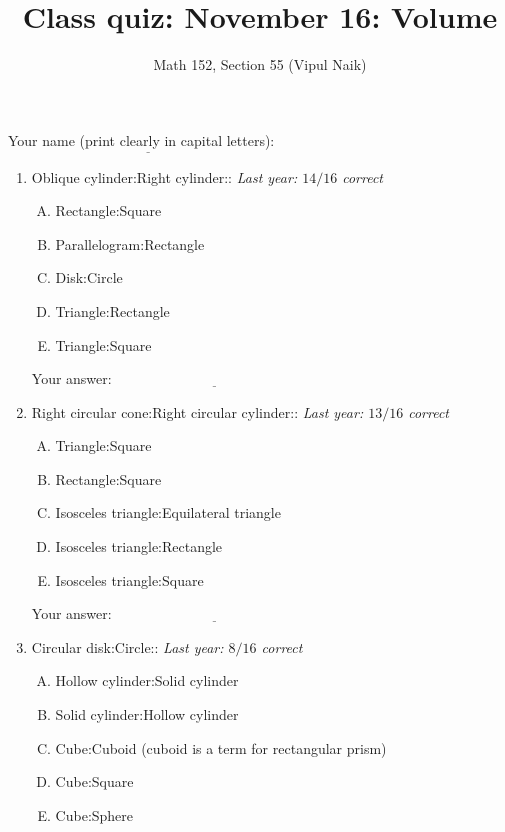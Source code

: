\documentclass[10pt]{amsart}
\title{Class quiz: November 16: Volume}
\author{Math 152, Section 55 (Vipul Naik)}
\begin{document}
\maketitle

Your name (print clearly in capital letters): $\underline{\qquad\qquad\qquad\qquad\qquad\qquad\qquad\qquad\qquad\qquad}$

\begin{enumerate}
\item Oblique cylinder:Right cylinder:: {\em Last year: $14/16$
  correct}

  \begin{enumerate}[(A)]
  \item Rectangle:Square
  \item Parallelogram:Rectangle
  \item Disk:Circle
  \item Triangle:Rectangle
  \item Triangle:Square
  \end{enumerate}

  \vspace{0.3in}
  Your answer: $\underline{\qquad\qquad\qquad\qquad\qquad\qquad\qquad}$
  \vspace{0.3in}

\item Right circular cone:Right circular cylinder:: {\em Last year:
  $13/16$ correct}

  \begin{enumerate}[(A)]
  \item Triangle:Square
  \item Rectangle:Square
  \item Isosceles triangle:Equilateral triangle
  \item Isosceles triangle:Rectangle
  \item Isosceles triangle:Square
  \end{enumerate}

  
  Your answer: $\underline{\qquad\qquad\qquad\qquad\qquad\qquad\qquad}$
  \vspace{0.3in}

\item Circular disk:Circle:: {\em Last year: $8/16$ correct}

  \begin{enumerate}[(A)]
  \item Hollow cylinder:Solid cylinder
  \item Solid cylinder:Hollow cylinder
  \item Cube:Cuboid (cuboid is a term for rectangular prism)
  \item Cube:Square
  \item Cube:Sphere
  \end{enumerate}


\end{enumerate}
\end{document}
